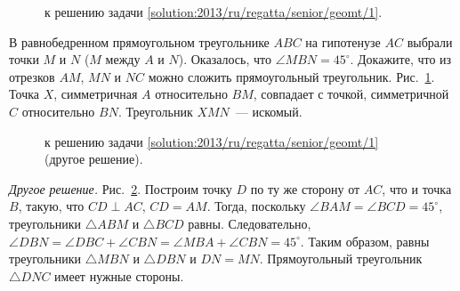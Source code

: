 \ifsolution
\begin{figure}\centering
    \caption{к решению задачи \ref{solution:2013/ru/regatta/senior/geomt/1}.}
    \label{fig:solution:2013/ru/regatta/senior/geomt/1}
\end{figure}
\fi %

\problem
В равнобедренном прямоугольном треугольнике $ABC$ на гипотенузе $AC$ выбрали
точки $M$ и $N$ ($M$ между $A$ и $N$).
Оказалось, что $\angle MBN = 45^\circ$.
Докажите, что из отрезков $AM$, $MN$ и $NC$ можно сложить прямоугольный
треугольник.
\solution
\label{solution:2013/ru/regatta/senior/geomt/1}%
Рис.~\ref{fig:solution:2013/ru/regatta/senior/geomt/1}.
Точка $X$, симметричная $A$ относительно $BM$, совпадает с точкой, симметричной
$C$ относительно $BN$.
Треугольник $XMN$~--- искомый.
\par
\begin{figure}\centering
    \caption{к решению задачи \ref{solution:2013/ru/regatta/senior/geomt/1}
        (другое решение).}
    \label{fig:solution:2013/ru/regatta/senior/geomt/1/another}
\end{figure}
\emph{Другое решение.}
Рис.~\ref{fig:solution:2013/ru/regatta/senior/geomt/1/another}.
Построим точку $D$ по ту же сторону от $AC$, что и точка $B$, такую, что
$CD \perp AC$, $CD = AM$.
Тогда, поскольку $\angle BAM = \angle BCD = 45^\circ$, треугольники
$\triangle ABM$ и $\triangle BCD$ равны.
Следовательно,
$\angle DBN = \angle DBC + \angle CBN = \angle MBA + \angle CBN = 45^\circ$.
Таким образом, равны треугольники $\triangle MBN$ и $\triangle DBN$ и
$DN = MN$.
Прямоугольный треугольник $\triangle DNC$ имеет нужные стороны.
\endproblem

